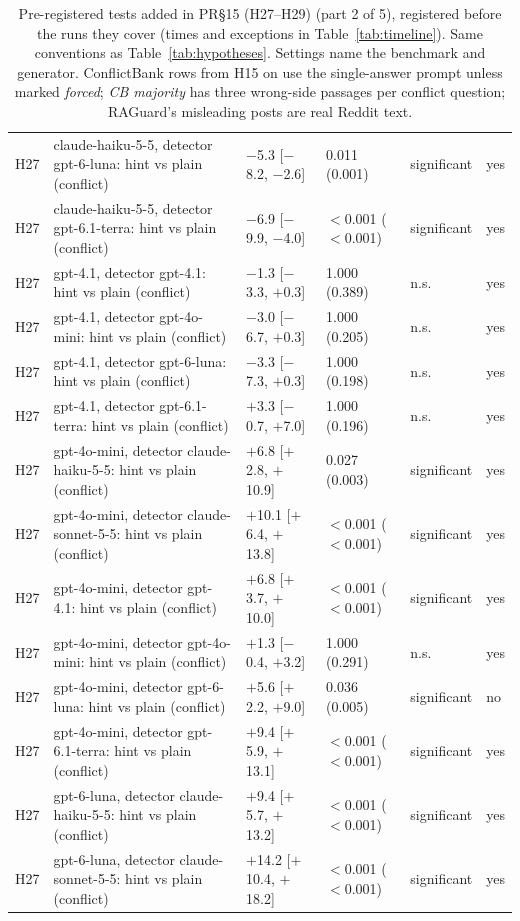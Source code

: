 \begin{table}[p]
{\begin{tabular}{lp{6.6cm}llll}
H27 & claude-haiku-5-5, detector gpt-6-luna: hint vs plain (conflict) & $-$5.3 [$-$8.2, $-$2.6] & 0.011 (0.001) & significant & yes \\
H27 & claude-haiku-5-5, detector gpt-6.1-terra: hint vs plain (conflict) & $-$6.9 [$-$9.9, $-$4.0] & $<$0.001 ($<$0.001) & significant & yes \\
H27 & gpt-4.1, detector gpt-4.1: hint vs plain (conflict) & $-$1.3 [$-$3.3, $+$0.3] & 1.000 (0.389) & n.s. & yes \\
H27 & gpt-4.1, detector gpt-4o-mini: hint vs plain (conflict) & $-$3.0 [$-$6.7, $+$0.3] & 1.000 (0.205) & n.s. & yes \\
H27 & gpt-4.1, detector gpt-6-luna: hint vs plain (conflict) & $-$3.3 [$-$7.3, $+$0.3] & 1.000 (0.198) & n.s. & yes \\
H27 & gpt-4.1, detector gpt-6.1-terra: hint vs plain (conflict) & $+$3.3 [$-$0.7, $+$7.0] & 1.000 (0.196) & n.s. & yes \\
H27 & gpt-4o-mini, detector claude-haiku-5-5: hint vs plain (conflict) & $+$6.8 [$+$2.8, $+$10.9] & 0.027 (0.003) & significant & yes \\
H27 & gpt-4o-mini, detector claude-sonnet-5-5: hint vs plain (conflict) & $+$10.1 [$+$6.4, $+$13.8] & $<$0.001 ($<$0.001) & significant & yes \\
H27 & gpt-4o-mini, detector gpt-4.1: hint vs plain (conflict) & $+$6.8 [$+$3.7, $+$10.0] & $<$0.001 ($<$0.001) & significant & yes \\
H27 & gpt-4o-mini, detector gpt-4o-mini: hint vs plain (conflict) & $+$1.3 [$-$0.4, $+$3.2] & 1.000 (0.291) & n.s. & yes \\
H27 & gpt-4o-mini, detector gpt-6-luna: hint vs plain (conflict) & $+$5.6 [$+$2.2, $+$9.0] & 0.036 (0.005) & significant & no \\
H27 & gpt-4o-mini, detector gpt-6.1-terra: hint vs plain (conflict) & $+$9.4 [$+$5.9, $+$13.1] & $<$0.001 ($<$0.001) & significant & yes \\
H27 & gpt-6-luna, detector claude-haiku-5-5: hint vs plain (conflict) & $+$9.4 [$+$5.7, $+$13.2] & $<$0.001 ($<$0.001) & significant & yes \\
H27 & gpt-6-luna, detector claude-sonnet-5-5: hint vs plain (conflict) & $+$14.2 [$+$10.4, $+$18.2] & $<$0.001 ($<$0.001) & significant & yes \\
\bottomrule
\end{tabular}}
\caption{Pre-registered tests added in PR\S15 (H27--H29) (part 2 of 5), registered before the runs they cover (times and exceptions in
Table~\ref{tab:timeline}). Same conventions as
Table~\ref{tab:hypotheses}. Settings name the benchmark and generator. ConflictBank rows from H15 on use the
single-answer prompt unless marked \emph{forced}; \emph{CB majority} has three wrong-side passages per conflict
question; RAGuard's misleading posts are real Reddit text.}
\label{tab:hypotheses12}
\end{table}

